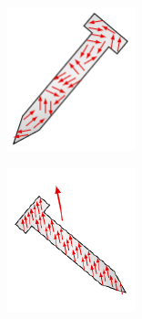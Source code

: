\documentclass{report}
\begin{document}
\begin{figure}[h]%
\centering
\begin{minipage}{.45\textwidth}
      \centering
      \includegraphics[width=.42\linewidth]{figures/spines_random.pdf}
      \label{fig:spines_random}
    
  \end{minipage}%
  \begin{minipage}{.5\textwidth}
    \centering
    \includegraphics[angle=270, origin=c, width=.45\linewidth]{figures/spines_organized.pdf}
    \label{fig:spines_organized}
  \end{minipage}
\label{fig:spines}
\end{figure}
\newpage
\end{document}
